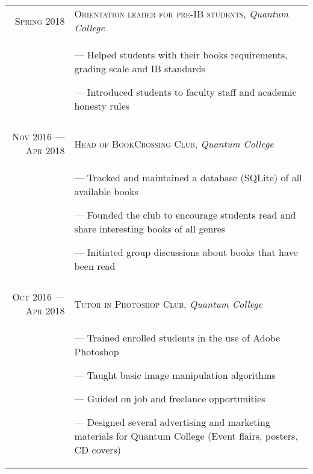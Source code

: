 \documentclass[a4paper,10pt]{article}
\begin{document}
\begin{tabular}{r|p{11cm}}
	\textsc{Spring 2018}           & \textsc{Orientation leader for pre-IB students}, \emph{Quantum College}                                            \\&\footnotesize{
		--- Helped students with their books requirements, grading scale and IB standards

		--- Introduced students to faculty staff and academic honesty rules
	}                                                                                                                                                   \\\multicolumn{2}{c}{}\\

	\textsc{Nov 2016 --- Apr 2018} & \textsc{Head of BookCrossing Club}, \emph{Quantum College}                                                         \\&\footnotesize{
		--- Tracked and maintained a database (SQLite) of all available books

		--- Founded the club to encourage students read and share interesting books of all genres

		--- Initiated group discussions about books that have been read
	}                                                                                                                                                   \\\multicolumn{2}{c}{}\\

	\textsc{Oct 2016 --- Apr 2018} & \textsc{Tutor in Photoshop Club}, \emph{Quantum College}                                                           \\&\footnotesize{
		--- Trained enrolled students in the use of Adobe Photoshop

		--- Taught basic image manipulation algorithms

		--- Guided on job and freelance opportunities

		--- Designed several advertising and marketing materials for Quantum College (Event flairs, posters, CD covers)
	}                                                                                                                                                   \\%
\end{tabular}


\end{document}
